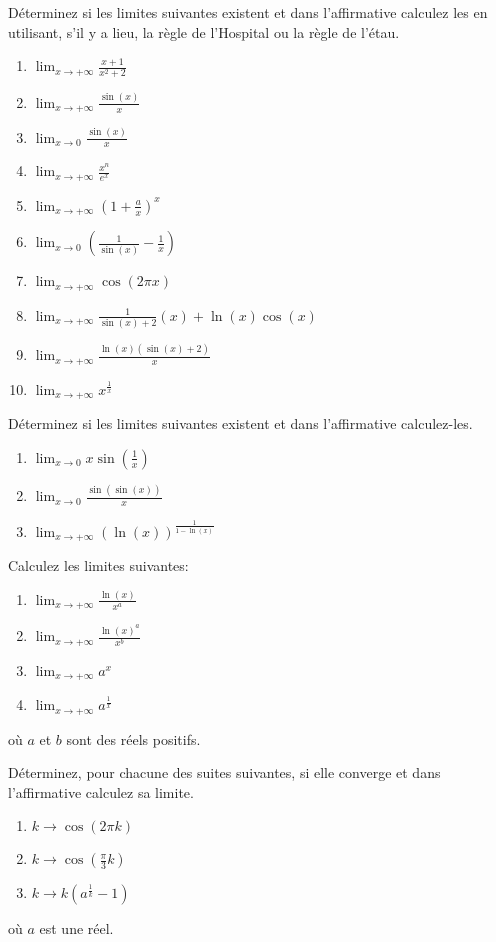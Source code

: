 \exerNico Déterminez si les limites suivantes existent et dans
l'affirmative calculez les en utilisant, s'il y a lieu, la règle de
l'Hospital ou la règle de l'étau.
\begin{enumerate}
\item $  \lim_{x \rightarrow  +\infty} \frac{x+1}{x^2+2} $
\item $  \lim_{x \rightarrow  +\infty} \frac{\sin(x)}{x} $
\item $  \lim_{x \rightarrow  0} \frac{\sin(x)}{x} $
\item $  \lim_{x \rightarrow  +\infty}  \frac{x ^n}{e ^x} $
\item $  \lim_{x \rightarrow  +\infty} (1 + \frac{a}{x})^x $
\item $  \lim_{x \rightarrow  0} (\frac{1}{\sin(x)} - \frac{1}{x} )$
\item $  \lim_{x \rightarrow  +\infty} \cos( 2 \pi x) $
\item $  \lim_{x \rightarrow  +\infty} \frac{1}{\sin(x)+2}(x) +\ln(x)\cos(x) $
\item $  \lim_{x \rightarrow  +\infty} \frac{ \ln(x)(\sin(x) +2)}{x} $
\item $  \lim_{x \rightarrow  +\infty} x ^\frac{1}{x} $
\end{enumerate}

\exerNico Déterminez si les limites suivantes existent et dans
l'affirmative calculez-les.
\begin{enumerate}
\item $  \lim_{x \rightarrow  0} x \sin(\frac{1}{x}) $
\item $  \lim_{x \rightarrow  0} \frac{\sin(\sin(x))}{x} $
\item $  \lim_{x \rightarrow  +\infty} (\ln(x))^\frac{1}{1 - \ln(x)}$
\end{enumerate}

\exerNico Calculez les limites suivantes:
\begin{enumerate}
\item $  \lim_{x \rightarrow  +\infty} \frac{\ln(x)}{x ^a} $
\item $  \lim_{x \rightarrow  +\infty} \frac{\ln(x)^a}{x ^b} $
\item $  \lim_{x \rightarrow  +\infty} a ^x $
\item $  \lim_{x \rightarrow  +\infty} a ^\frac{1}{x} $
\end{enumerate}
où $a$ et $b$ sont des réels positifs.
%

%

\exerNico Déterminez, pour chacune des suites suivantes, si elle converge
et dans l'affirmative calculez sa limite.
\begin{enumerate}
\item $  k \rightarrow  \cos( 2 \pi k) $
\item $  k \rightarrow  \cos(\frac{\pi}{3} k) $
\item $  k \rightarrow  k(a ^\frac{1}{k} -1 ) $
\end{enumerate}
où $a$ est une réel.\\



